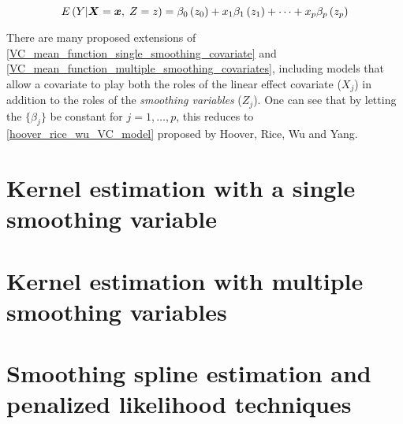 \documentclass[12pt]{article}
\newcommand{\bfx}{\mbox{\boldmath $x$}}
\newcommand{\bfX}{\mbox{\boldmath $X$}}
\begin{document}
\begin{equation}
E\left(Y \vert \bfX=\bfx,\;Z = z \right) = \beta_0\left(z_0\right) + x_1\beta_1\left(z_1\right) + \dots  + x_p\beta_p\left(z_p\right) \label{VC_mean_function_multiple_smoothing_covariates}
\end{equation}

There are many proposed extensions of \eqref{VC_mean_function_single_smoothing_covariate} and \eqref{VC_mean_function_multiple_smoothing_covariates}, including models that allow a covariate to play both the roles of the linear effect covariate ($X_j$) in addition to the roles of the \textit{smoothing variables} ($Z_j$). One can see that by letting the $\lbrace  \beta_j \rbrace$ be constant for $j=1, \dots, p$, this reduces to \eqref{hoover_rice_wu_VC_model} proposed by Hoover, Rice, Wu and Yang. 

\section{Kernel estimation with a single smoothing variable}

\section{Kernel estimation with multiple smoothing variables}

\section{Smoothing spline estimation and penalized likelihood techniques}
\end{document}
